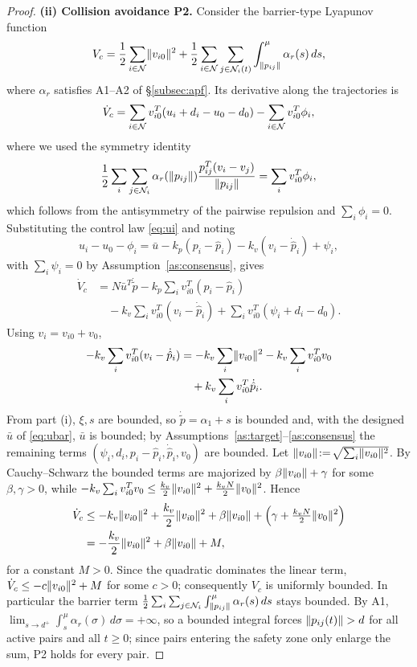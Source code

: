 \begin{proof}
\noindent\textbf{(ii) Collision avoidance P2.}
Consider the barrier-type Lyapunov function
\begin{equation}
V_c = \frac12\sum_{i\in\mathcal{N}}\lVert v_{i0} \rVert^2
    + \frac12\sum_{i\in\mathcal{N}}\sum_{j\in\mathcal{N}_i(t)}
      \int_{\lVert p_{ij} \rVert}^\mu \alpha_r(s)\,ds,
\label{eq:Vc}
\end{equation}
where $\alpha_r$ satisfies A1--A2 of \S\ref{subsec:apf}. Its derivative
along the trajectories is
\[
\dot V_c = \sum_{i\in\mathcal{N}} v_{i0}^T(u_i+d_i-u_0-d_0)
         - \sum_{i\in\mathcal{N}} v_{i0}^T\phi_i,
\]
where we used the symmetry identity
\[
\frac12\sum_i\sum_{j\in\mathcal{N}_i}
   \alpha_r(\lVert p_{ij} \rVert)
   \frac{p_{ij}^T(v_i-v_j)}{\lVert p_{ij} \rVert}
 = \sum_i v_{i0}^T\phi_i,
\]
which follows from the antisymmetry of the pairwise repulsion and
$\sum_i\phi_i=0$. Substituting the control law \eqref{eq:ui} and noting
\[
u_i-u_0-\phi_i
= \bar u-k_p(p_i-\hat p_i)-k_v(v_i-\dot{\hat p}_i)+\psi_i,
\]
with $\sum_i\psi_i=0$ by Assumption~\ref{as:consensus}, gives
\[
\begin{aligned}
\dot V_c
&= N\bar u^T\dot{\tilde p}
   - k_p\sum_{i} v_{i0}^T(p_i-\hat p_i)\\
&\quad - k_v\sum_{i} v_{i0}^T(v_i-\dot{\hat p}_i)
   + \sum_{i} v_{i0}^T(\psi_i+d_i-d_0).
\end{aligned}
\]
Using $v_i=v_{i0}+v_0$,
\[
\begin{aligned}
-k_v\sum_i v_{i0}^T(v_i-\dot{\hat p}_i)
&= -k_v\sum_i\lVert v_{i0} \rVert^2
   - k_v\sum_i v_{i0}^Tv_0 \\
&\quad + k_v\sum_i v_{i0}^T\dot{\hat p}_i .
\end{aligned}
\]
From part (i), $\xi,s$ are bounded, so $\dot{\tilde p}=\alpha_1+s$ is
bounded and, with the designed $\bar u$ of \eqref{eq:ubar}, $\bar u$ is
bounded; by Assumptions~\ref{as:target}--\ref{as:consensus} the remaining
terms $(\psi_i,d_i,p_i-\hat p_i,\dot{\hat p}_i,v_0)$ are bounded. Let
$\lVert v_{i0} \rVert\!:=\!\sqrt{\sum_i\lVert v_{i0} \rVert^2}$. By Cauchy--Schwarz the
bounded terms are majorized by $\beta\lVert v_{i0} \rVert+\gamma$ for some
$\beta,\gamma>0$, while
$-k_v\sum_i v_{i0}^Tv_0\le \frac{k_v}{2}\lVert v_{i0} \rVert^2+\frac{k_vN}{2}\lVert v_0 \rVert^2$.
Hence
\[
\begin{aligned}
  \dot V_c
  &\le -k_v\lVert v_{i0} \rVert^2 + \frac{k_v}{2}\lVert v_{i0} \rVert^2
            + \beta\lVert v_{i0} \rVert
            + \Bigl(\gamma+\tfrac{k_vN}{2}\lVert v_0 \rVert^2\Bigr)\\
  &= -\frac{k_v}{2}\lVert v_{i0} \rVert^2 + \beta\lVert v_{i0} \rVert + M,
\end{aligned}
\]
for a constant $M>0$. Since the quadratic dominates the linear term,
$\dot V_c\le -c\lVert v_{i0} \rVert^2+M$ for some $c>0$; consequently $V_c$ is
uniformly bounded. In particular the barrier term
$\frac12\sum_i\sum_{j\in\mathcal{N}_i}\int_{\lVert p_{ij} \rVert}^\mu\alpha_r(s)\,ds$ stays
bounded. By A1,
$\lim_{s\to d^+}\int_s^\mu\alpha_r(\sigma)\,d\sigma=+\infty$, so a bounded
integral forces $\lVert p_{ij}(t) \rVert>d$ for all active pairs and all
$t\ge0$; since pairs entering the safety zone only enlarge the sum, P2 holds
for every pair.


\end{proof}

